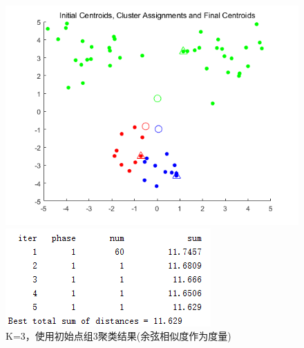 \documentclass[cn]{elegantbook}
\begin{document}
\begin{figure}[!h]
	\centering
	\begin{minipage}{0.48\linewidth}
		\centering
		\includegraphics[width=\linewidth]{images/res334}
	\end{minipage}
	\begin{minipage}{0.48\linewidth}
		\centering
		\includegraphics[width=\linewidth]{images/res335}
	\end{minipage}
	\caption{\label{res332}K=3，使用初始点组3聚类结果(余弦相似度作为度量)}
\end{figure}
\end{document}
